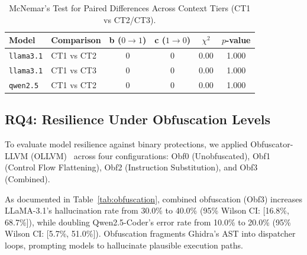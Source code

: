 \documentclass[runningheads]{llncs}
\begin{document}
\begin{table}[h]
\centering
\caption{McNemar's Test for Paired Differences Across Context Tiers (CT1 vs CT2/CT3).}
\label{tab:mcnemar}
\begin{tabular}{llcccc}
\toprule
\textbf{Model} & \textbf{Comparison} & \textbf{b ($0\rightarrow 1$)} & \textbf{c ($1\rightarrow 0$)} & $\chi^2$ & $p$-value \\
\midrule
\texttt{llama3.1} & CT1 vs CT2 & 0 & 0 & 0.00 & 1.000 \\
\texttt{llama3.1} & CT1 vs CT3 & 0 & 0 & 0.00 & 1.000 \\
\texttt{qwen2.5}  & CT1 vs CT2 & 0 & 0 & 0.00 & 1.000 \\
\bottomrule
\end{tabular}
\end{table}

\subsection{RQ4: Resilience Under Obfuscation Levels}
To evaluate model resilience against binary protections, we applied Obfuscator-LLVM (OLLVM)~\cite{junod2015ollvm} across four configurations: Obf0 (Unobfuscated), Obf1 (Control Flow Flattening), Obf2 (Instruction Substitution), and Obf3 (Combined).

As documented in Table~\ref{tab:obfuscation}, combined obfuscation (Obf3) increases LLaMA-3.1's hallucination rate from 30.0\% to 40.0\% (95\% Wilson CI: [16.8\%, 68.7\%]), while doubling Qwen2.5-Coder's error rate from 10.0\% to 20.0\% (95\% Wilson CI: [5.7\%, 51.0\%]). Obfuscation fragments Ghidra's AST into dispatcher loops, prompting models to hallucinate plausible execution paths.
\end{document}
